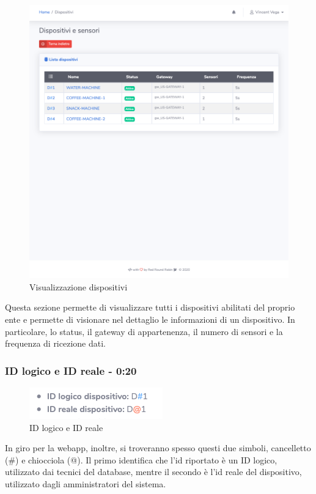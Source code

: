 		\begin{figure}[H]
		\centering
		\includegraphics[scale=0.600]{res/images/membro/visDispositivi.png}
		\caption{Visualizzazione dispositivi}
		\end{figure}
		Questa sezione permette di visualizzare tutti i dispositivi abilitati del proprio ente e permette di visionare nel dettaglio le informazioni di un dispositivo.
		In particolare, lo status, il gateway di appartenenza, il numero di sensori e la frequenza di ricezione dati. 


	\subsubsection{ID logico e ID reale - 0:20}
		\begin{figure}[H]
		\centering
		\includegraphics[scale=0.600]{res/images/membro/IDLogicoIDReale.png}
		\caption{ID logico e ID reale}
		\end{figure}
		In giro per la webapp, inoltre, si troveranno spesso questi due simboli, cancelletto (\#) e chiocciola (@). Il primo identifica che l'id riportato è un ID logico, utilizzato dai tecnici del database, mentre il secondo è l'id reale del dispositivo, utilizzato dagli amministratori del sistema.

